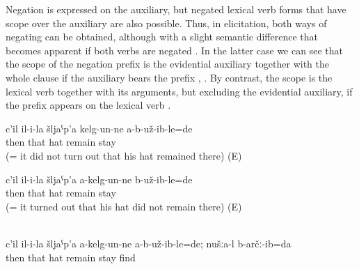 Negation is expressed on the auxiliary, but negated lexical verb forms that have scope over the auxiliary are also possible. Thus, in elicitation, both ways of negating can be obtained, although with a slight semantic difference that becomes apparent if both verbs are negated . In the latter case we can see that the scope of the negation prefix is the evidential auxiliary together with the whole clause if the auxiliary bears the prefix , . By contrast, the scope is the lexical verb together with its arguments, but excluding the evidential auxiliary, if the prefix appears on the lexical verb .
%
\begin{exe}
		\ex	\label{ex:Then (apparently) his hat did not remain there@14a}
		\gll	c'il	il-i-la	šljaˁp'a	kelg-un-ne	a-b-už-ib-le=de\\
			then	that	hat	remain	stay\\
		\glt	{} (= it did not turn out that his hat remained there) (E)

		\ex	\label{ex:Then (apparently) his hat did not remain there@14b}
		\gll	c'il	il-i-la	šljaˁp'a	a-kelg-un-ne	b-už-ib-le=de\\
			then	that	hat	remain	stay\\
		\glt	{} (= it turned out that his hat did not remain there) (E)

		\\\label{ex:Then it did not turn out that his hat did not remain there, but (by contrast) we found it (there)@14c}%
		\gll	c'il	il-i-la	šljaˁp'a	a-kelg-un-ne	a-b-už-ib-le=de; nušːa-l	b-arčː-ib=da\\
			then	that	hat	remain	stay		find\\
		\glt	{}
\end{exe}

